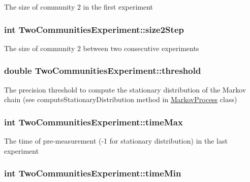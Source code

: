 The size of community 2 in the first experiment \hypertarget{class_two_communities_experiment_a71ef9b90f7bf40e0c8c008c397ccc14b}{
\subsubsection[{size2\-Step}]{\setlength{\rightskip}{0pt plus 5cm}int Two\-Communities\-Experiment\-::size2\-Step}}\label{class_two_communities_experiment_a71ef9b90f7bf40e0c8c008c397ccc14b}
The size of community 2 between two consecutive experiments \hypertarget{class_two_communities_experiment_a31d5e198fae6cb9993a95f77b44b3bae}{
\subsubsection[{threshold}]{\setlength{\rightskip}{0pt plus 5cm}double Two\-Communities\-Experiment\-::threshold}}\label{class_two_communities_experiment_a31d5e198fae6cb9993a95f77b44b3bae}
The precision threshold to compute the stationary distribution of the Markov chain (see compute\-Stationary\-Distribution method in \hyperlink{class_markov_process}{Markov\-Process} class) \hypertarget{class_two_communities_experiment_ad08bd64c47132b4dfa2ed6d3408bcc06}{
\subsubsection[{time\-Max}]{\setlength{\rightskip}{0pt plus 5cm}int Two\-Communities\-Experiment\-::time\-Max}}\label{class_two_communities_experiment_ad08bd64c47132b4dfa2ed6d3408bcc06}
The time of pre-\/measurement (-\/1 for stationary distribution) in the last experiment \hypertarget{class_two_communities_experiment_a5c4868cca512ddd93f7cbdac070a1ed8}{
\subsubsection[{time\-Min}]{\setlength{\rightskip}{0pt plus 5cm}int Two\-Communities\-Experiment\-::time\-Min}}\label{class_two_communities_experiment_a5c4868cca512ddd93f7cbdac070a1ed8}
